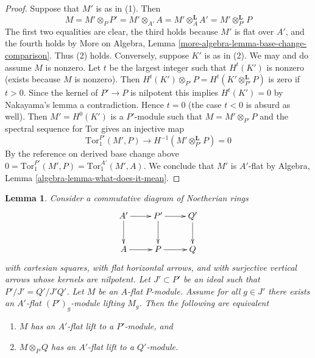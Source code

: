 \documentclass{stacks-project}
\theoremstyle{plain}
\newtheorem{lemma}[subsection]{Lemma}
\theoremstyle{definition}
\theoremstyle{remark}
\numberwithin{equation}{subsection}
\begin{document}
\begin{proof}
Suppose that $M'$ is as in (1). Then
$$
M = M' \otimes_P P' = M' \otimes_{A'} A =
M' \otimes_A^\mathbf{L} A' = M' \otimes_{P'}^\mathbf{L} P
$$
The first two equalities are clear, the third holds because
$M'$ is flat over $A'$, and the fourth holds by
More on Algebra, Lemma \ref{more-algebra-lemma-base-change-comparison}.
Thus (2) holds. Conversely, suppose $K'$ is as in (2).
We may and do assume $M$ is nonzero.
Let $t$ be the largest integer such that $H^t(K')$ is nonzero
(exists because $M$ is nonzero).
Then $H^t(K') \otimes_{P'} P = H^t(K' \otimes_{P'}^\mathbf{L} P)$
is zero if $t > 0$. Since the kernel of $P' \to P$ is nilpotent
this implies $H^t(K') = 0$ by Nakayama's lemma a contradiction.
Hence $t = 0$ (the case $t < 0$ is absurd as well).
Then $M' = H^0(K')$ is a $P'$-module such that $M = M' \otimes_{P'} P$
and the spectral sequence for Tor gives an injective map
$$
\text{Tor}_1^{P'}(M', P) \to H^{-1}(M' \otimes_{P'}^\mathbf{L} P) = 0
$$
By the reference on derived base change above
$0 = \text{Tor}_1^{P'}(M', P) = \text{Tor}_1^{A'}(M', A)$.
We conclude that $M'$ is $A'$-flat by
Algebra, Lemma \ref{algebra-lemma-what-does-it-mean}.
\end{proof}

\begin{lemma}
\label{lemma-lift-equivalence-module}
Consider a commutative diagram of Noetherian rings
$$
\xymatrix{
A' \ar[d] \ar[r] &
P' \ar[d] \ar[r] &
Q' \ar[d] \\
A \ar[r] &
P \ar[r] &
Q
}
$$
with cartesian squares, with flat horizontal arrows, and with
surjective vertical arrows whose kernels are nilpotent.
Let $J' \subset P'$ be an ideal such that $P'/J' = Q'/J'Q'$.
Let $M$ be an $A$-flat $P$-module.
Assume for all $g \in J'$ there exists an $A'$-flat $(P')_g$-module
lifting $M_g$. Then the following are equivalent
\begin{enumerate}
\item $M$ has an $A'$-flat lift to a $P'$-module, and
\item $M \otimes_P Q$ has an $A'$-flat lift to a $Q'$-module.
\end{enumerate}
\end{lemma}
\end{document}
